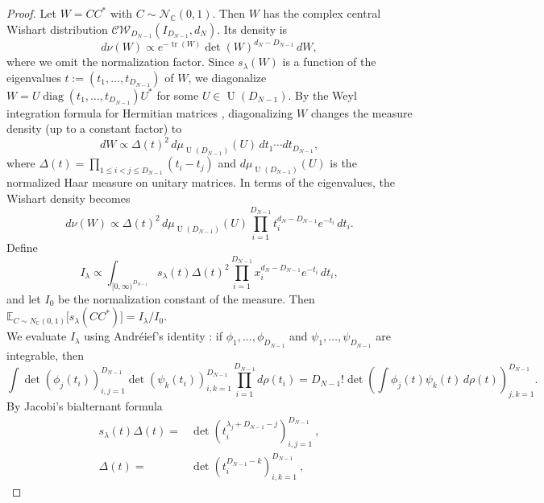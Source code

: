 \documentclass{article}
\theoremstyle{definition}
\DeclareMathOperator{\U}{U}
\newcommand{\C}{\mathbb{C}}
\begin{document}
\begin{proof}
Let \(W=CC^*\) with $C \sim \mathcal N_{\C}(0,1)$. Then \(W\) has the complex central Wishart distribution
\(\mathcal{CW}_{D_{N-1}}(I_{D_{N-1}},d_N)\). Its density is \cite{goodman_1963}
\[
d\nu(W)
\propto e^{-\operatorname{tr}(W)}
\det(W)^{d_N-D_{N-1}}\,dW,
\]
where we omit the normalization factor. Since \(s_\lambda(W)\) is a function of the eigenvalues $t := (t_1,\dots,t_{D_{N-1}})$ of \(W\), we diagonalize \(W=U\operatorname{diag}(t_1,\dots,t_{D_{N-1}})U^*\) for some $U\in\U(D_{N-1})$.
By the Weyl integration formula for Hermitian matrices \cite[Theorem 10.1.1]{Faraut_2008}, diagonalizing $W$ changes the measure density (up to a constant factor) to 
\[
dW
\propto\Delta(t)^2\,d\mu_{\U(D_{N-1})}(U)\,dt_1\cdots dt_{D_{N-1}},
\]
where $\Delta(t)=\prod_{1\le i<j\le D_{N-1}}(t_i-t_j)$ and $d\mu_{\U(D_{N-1})}(U)$ is the normalized Haar measure on unitary matrices. In terms of the eigenvalues, the Wishart density becomes 
\begin{equation*}
    d\nu(W)
\propto \Delta(t)^2\,d\mu_{\U(D_{N-1})}(U)\prod_{i=1}^{D_{N-1}} t_i^{d_N-D_{N-1}}e^{-t_i}\,dt_i.
\end{equation*}
Define
\begin{equation*}
    I_\lambda
\propto
\int_{[0,\infty)^{D_{N-1}}}
s_\lambda(t)\Delta(t)^2
 \prod_{i=1}^{D_{N-1}} x_i^{d_N-D_{N-1}}e^{-t_i}\,dt_i,%
\end{equation*}
and let $I_0$ be the normalization constant of the measure. Then $\mathbb E_{C \sim N_{\C}(0,1)}\Big[s_\lambda(CC^*)\Big] = I_\lambda/I_0$.
\\
We evaluate \(I_\lambda\) using Andréief's identity \cite{andreief_1886}:
if \(\phi_1,\dots,\phi_{D_{N-1}}\) and \(\psi_1,\dots,\psi_{D_{N-1}}\) are integrable, then
\begin{equation}\label{eq:andreief}
    \int
\det(\phi_j(t_i))_{i,j=1}^{D_{N-1}}
\det(\psi_k(t_i))_{i,k=1}^{D_{N-1}}
\prod_{i=1}^{D_{N-1}} d\rho(t_i)
=
D_{N-1}!\det\left(
\int \phi_j(t)\psi_k(t)\,d\rho(t)
\right)_{j,k=1}^{D_{N-1}}.
\end{equation}
By Jacobi's bialternant formula \cite{Macdonald_1995}
\begin{align}\label{eq:s_delta}
s_\lambda(t)\Delta(t)
=&
\det\left(t_i^{\lambda_j+D_{N-1}-j}\right)_{i,j=1}^{D_{N-1}}\ ,\\ \label{eq:delta}
\Delta(t)
=&
\det\left(t_i^{D_{N-1}-k}\right)_{i,k=1}^{D_{N-1}}\ ,
\end{align} 

\end{proof}
\end{document}
